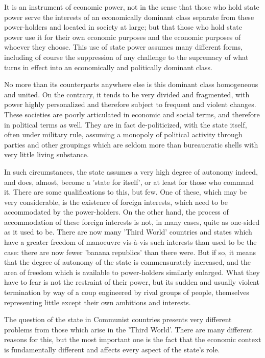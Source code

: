 It is an instrument of economic power, not in the sense that those who hold state power serve the interests of an economically dominant class separate from these power-holders and located in society at large; but that those who hold state power use it for their own economic purposes and the economic purposes of whoever they choose. This use of state power assumes many different forms, including of course the suppression of any challenge to the supremacy of what turns in effect into an economically and politically dominant class.

No more than its counterparts anywhere else is this dominant class homogeneous and united. On the contrary, it tends to be very divided and fragmented, with power highly personalized and therefore subject to frequent and violent changes. These societies are poorly articulated in economic and social terms, and therefore in political terms as well. They are in fact de\hyp{}politicized, with the state itself, often under military rule, assuming a monopoly of political activity through parties and other groupings which are seldom more than bureaucratic shells with very little living substance.

In such circumstances, the state assumes a very high degree of autonomy indeed, and does, almost, become a 'state for itself', or at least for those who command it. There are some qualifications to this, but few. One of these, which may be very considerable, is the existence of foreign interests, which need to be accommodated by the power-holders. On the other hand, the process of accommodation of these foreign interests is not, in many cases, quite as one-sided as it used to be. There are now many 'Third World' countries and states which have a greater freedom of manoeuvre vis-à-vis such interests than used to be the case: there are now fewer 'banana republics' than there were. But if so, it means that the degree of autonomy of the state is commensurately increased, and the area of freedom which is available to power-holders similarly enlarged. What they have to fear is not the restraint of their power, but its sudden and usually violent termination by way of a coup engineered by rival groups of people, themselves representing little except their own ambitions and interests.

The question of the state in Communist countries presents very different problems from those which arise in the 'Third World'. There are many different reasons for this, but the most important one is the fact that the economic context is fundamentally different and affects every aspect of the state's role.


